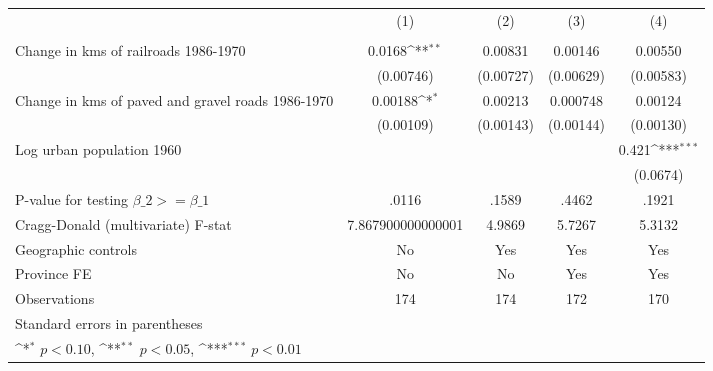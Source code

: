 {
\def\sym#1{\ifmmode^{#1}\else\(^{#1}\)\fi}
\begin{tabular}{l*{4}{c}}
\hline\hline
                &\multicolumn{1}{c}{(1)}&\multicolumn{1}{c}{(2)}&\multicolumn{1}{c}{(3)}&\multicolumn{1}{c}{(4)}\\
                &\multicolumn{1}{c}{}&\multicolumn{1}{c}{}&\multicolumn{1}{c}{}&\multicolumn{1}{c}{}\\
\hline
Change in kms of railroads 1986-1970&   0.0168\sym{**} &  0.00831         &  0.00146         &  0.00550         \\
                &(0.00746)         &(0.00727)         &(0.00629)         &(0.00583)         \\
[1em]
Change in kms of paved and gravel roads 1986-1970&  0.00188\sym{*}  &  0.00213         & 0.000748         &  0.00124         \\
                &(0.00109)         &(0.00143)         &(0.00144)         &(0.00130)         \\
[1em]
Log urban population 1960&                  &                  &                  &    0.421\sym{***}\\
                &                  &                  &                  & (0.0674)         \\
\hline
P-value for testing $\beta\_{2} >= \beta\_{1}$&    .0116         &    .1589         &    .4462         &    .1921         \\
Cragg-Donald (multivariate) F-stat&7.867900000000001         &   4.9869         &   5.7267         &   5.3132         \\
Geographic controls&       No         &      Yes         &      Yes         &      Yes         \\
Province FE     &       No         &       No         &      Yes         &      Yes         \\
Observations    &      174         &      174         &      172         &      170         \\
\hline\hline
\multicolumn{5}{l}{\footnotesize Standard errors in parentheses}\\
\multicolumn{5}{l}{\footnotesize \sym{*} \(p<0.10\), \sym{**} \(p<0.05\), \sym{***} \(p<0.01\)}\\
\end{tabular}
}
